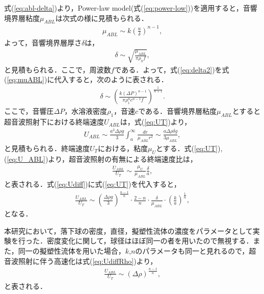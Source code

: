 式(\ref{eq:abl-delta})より，Power-law model(式(\ref{eq:power-low}))を適用すると，音響境界層粘度$\mu_{ABL}$は次式の様に見積もられる．
\begin{eqnarray}
    \mu_{ABL} \sim k\left(\frac{u}{\delta}\right)^{n-1} ,
    \label{eq:muABL}
\end{eqnarray}
よって，音響境界層厚さ$\delta$は，
\begin{eqnarray}
    \delta \sim \sqrt{\frac{\mu_{ABL}}{\pi \rho_h f}} ,
    \label{eq:delta2}
\end{eqnarray}
と見積もられる\cite{deshpande2001vibrational,wiklund2012acoustofluidics}．ここで，周波数$f$である．よって，式(\ref{eq:delta2})を式(\ref{eq:muABL})に代入すると，次のように表される．
\begin{eqnarray}
    \delta \sim \left(\frac{k\left(\Delta P\right)^{n-1}}{\pi \rho^n_1 c^{n-1} f}\right)^{\frac{1}{n+1}} .
    \label{eq:delta}
\end{eqnarray}
ここで，音響圧$\Delta P$，水溶液密度$\rho_1$，音速$c$である．音響境界層粘度$\mu_{ABL}$とすると超音波照射下における終端速度$U_{ABL}$は，式(\ref{eq:UT})より，
\begin{eqnarray}
    U_{ABL} \sim \frac{a^3\Delta\rho g}{3}  \int^{\infty}_{a} \frac{dr}{\mu_{ABL} r^2} \sim \frac{a\Delta \rho \delta g}{3\mu_{ABL}} ,
    \label{eq:U_ABL}
\end{eqnarray}
と見積もられる．終端速度$U_T$における，粘度$\mu_U$とする．式(\ref{eq:UT}),(\ref{eq:U_ABL})より，超音波照射の有無による終端速度比は，
\begin{eqnarray}
    \frac{U_{ABL}}{U_T} \sim \frac{\mu_U}{\mu_{ABL}}\frac{\delta}{a} ,
    \label{eq:Udiff}
\end{eqnarray}
と表される．式(\ref{eq:Udiff})に式(\ref{eq:UT})を代入すると，
\begin{eqnarray}
    \frac{U_{ABL}}{U_T} \sim \left(\frac{\Delta\rho{}g}{3}\right)^{\frac{n-1}{n}}\cdot\frac{2-n}{n}\cdot\frac{\delta}{\mu_{ABL}}\cdot\left(\frac{k}{a}\right)^{\frac{1}{n}} ,
    \label{eq:UdiffRho}
\end{eqnarray}
となる．

本研究において，落下球の密度，直径，擬塑性流体の濃度をパラメータとして実験を行った．密度変化に関して，球径はほぼ同一の者を用いたので無視する．また，同一の擬塑性流体を用いた場合，$k$,$n$のパラメータも同一と見れるので，超音波照射に伴う高速化は式(\ref{eq:UdiffRho})より，
\begin{eqnarray}
    \frac{U_{ABL}}{U_T} \sim \left(\Delta\rho{}\right)^{\frac{n-1}{n}} ,
    \label{eq:UdiffRho2}
\end{eqnarray}
と表される．
